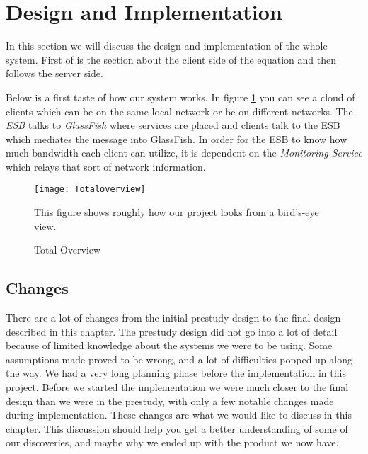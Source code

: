 \section{Design and Implementation}\label{Design and Implementation}
	In this section we will discuss the design and implementation of the whole system. First of is the section about the client side of the equation and then follows the server side. 
	
	Below is a first taste of how our system works. In figure \ref{fig:totaloverview} you can see a cloud of clients which can be on the same local network or be on different networks. The \textit{ESB} talks to \textit{GlassFish} where services are placed and clients talk to the ESB which mediates the message into GlassFish. In order for the ESB to know how much bandwidth each client can utilize, it is dependent on the \textit{Monitoring Service} which relays that sort of network information.
    
    \begin{figure}[H]
        \centering
        \texttt{[image: Totaloverview]}
        \caption{Total Overview}
        This figure shows roughly how our project looks from a bird's-eye view.
        \label{fig:totaloverview}
    \end{figure}

    
    
    
    \subsection{Changes}\label{Changes}
        There are a lot of changes from the initial prestudy design to the final design described in this chapter. The prestudy design did not go into a lot of detail because of limited knowledge about the systems we were to be using. Some assumptions made proved to be wrong, and a lot of difficulties popped up along the way. We had a very long planning phase before the implementation in this project. Before we started the implementation we were much closer to the final design than we were in the prestudy, with only a few notable changes made during implementation. These changes are what we would like to discuss in this chapter. This discussion should help you get a better understanding of some of our discoveries, and maybe why we ended up with the product we now have.

      
